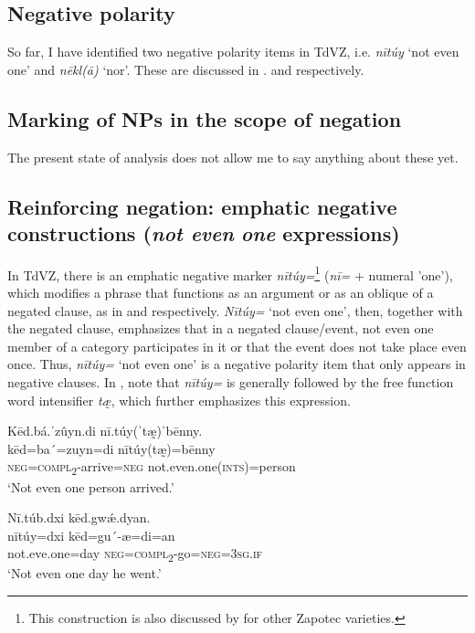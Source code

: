 \documentclass[output=paper,colorlinks=true, citecolor=brown]{langscibook}
\begin{document}
\subsection{Negative polarity}\label{sec:zap:4.2}

So far, I have identified two negative polarity items in TdVZ, i.e. \textit{nītúy} ‘not even one’ and \textit{nēkl(ā)} ‘nor’. These are discussed in . and  respectively.
    
\subsection{Marking of NPs in the scope of negation} \label{sec:zap:4.3}

The present state of analysis does not allow me to say anything about these yet.

\subsection{Reinforcing negation: emphatic negative constructions (\textit{not even} \textit{one} expressions)}
\label{sec:zap:4.4}
In TdVZ, there is an emphatic negative marker \textit{nītúy=}\footnote{This construction is also discussed by \citet{GalantForeman2010} for other Zapotec varieties.} (\textit{nī=} + numeral 'one'), which modifies a phrase that functions as an argument or as an oblique of a negated clause, as in  and  respectively. \textit{Nītúy=} ‘not even one’, then, together with the negated clause, emphasizes that in a negated clause/event, not even one member of a category participates in it or that the event does not take place even once. Thus, \textit{nītúy=} ‘not even one’ is a negative polarity item that only appears in negative clauses. In , note that \textit{nītúy=} is generally followed by the free function word intensifier \textit{tæ̰}, which further emphasizes this expression.

\ea\label{ex:zap:88} 
    \glll Kēd.bá.ˈzûyn.di nī.túy(ˈtæ̰)ˈbēnny.\\ 
           kēd=ba´=zuyn=di nītúy(tæ̰)=bēnny\\
           \textsc{neg}=\textsc{compl}\textsc{\textsubscript{2}}{}-arrive=\textsc{neg} not.even.one(\textsc{ints})=person\\
    \glt  ‘Not even one person arrived.’
\z 

\ea\label{ex:zap:89} 
    \glll Nī.túb.dxi kēd.gwǽ.dyan.\\ 
           nītúy=dxi kēd=gu´-æ=di=an\\
          not.eve.one=day \textsc{neg}=\textsc{compl}\textsc{\textsubscript{2}}{}-go=\textsc{neg}=\textsc{3sg.if} \\
    \glt ‘Not even one day he went.’
\z 
\end{document}
